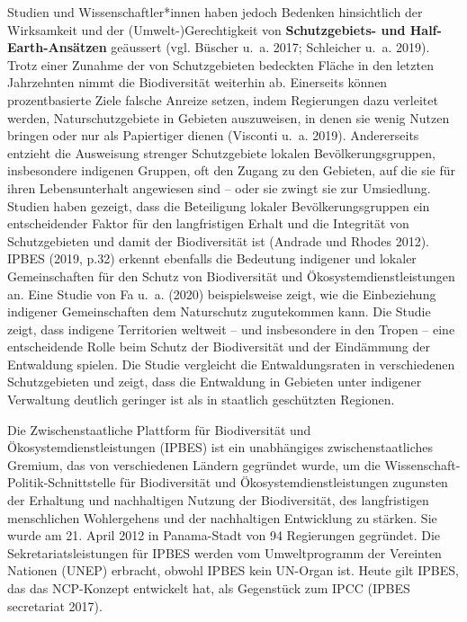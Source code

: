 \documentclass[
  nswissgerman,
  a4paper,
  openany]{book}
\begin{document}
Studien und Wissenschaftler*innen haben jedoch Bedenken hinsichtlich der
Wirksamkeit und der (Umwelt-)Gerechtigkeit von \textbf{Schutzgebiets-
und Half-Earth-Ansätzen} geäussert (vgl. Büscher u.~a. 2017; Schleicher
u.~a. 2019). Trotz einer Zunahme der von Schutzgebieten bedeckten Fläche
in den letzten Jahrzehnten nimmt die Biodiversität weiterhin ab.
Einerseits können prozentbasierte Ziele falsche Anreize setzen, indem
Regierungen dazu verleitet werden, Naturschutzgebiete in Gebieten
auszuweisen, in denen sie wenig Nutzen bringen oder nur als Papiertiger
dienen (Visconti u.~a. 2019). Andererseits entzieht die Ausweisung
strenger Schutzgebiete lokalen Bevölkerungsgruppen, insbesondere
indigenen Gruppen, oft den Zugang zu den Gebieten, auf die sie für ihren
Lebensunterhalt angewiesen sind -- oder sie zwingt sie zur Umsiedlung.
Studien haben gezeigt, dass die Beteiligung lokaler Bevölkerungsgruppen
ein entscheidender Faktor für den langfristigen Erhalt und die
Integrität von Schutzgebieten und damit der Biodiversität ist (Andrade
und Rhodes 2012). IPBES (2019, p.32) erkennt ebenfalls die Bedeutung
indigener und lokaler Gemeinschaften für den Schutz von Biodiversität
und Ökosystemdienstleistungen an. Eine Studie von Fa u.~a. (2020)
beispielsweise zeigt, wie die Einbeziehung indigener Gemeinschaften dem
Naturschutz zugutekommen kann. Die Studie zeigt, dass indigene
Territorien weltweit -- und insbesondere in den Tropen -- eine
entscheidende Rolle beim Schutz der Biodiversität und der Eindämmung der
Entwaldung spielen. Die Studie vergleicht die Entwaldungsraten in
verschiedenen Schutzgebieten und zeigt, dass die Entwaldung in Gebieten
unter indigener Verwaltung deutlich geringer ist als in staatlich
geschützten Regionen.

\begin{tcolorbox}[enhanced jigsaw, arc=.35mm, bottomrule=.15mm, bottomtitle=1mm, breakable, colback=white, colbacktitle=quarto-callout-note-color!10!white, colframe=quarto-callout-note-color-frame, coltitle=black, left=2mm, leftrule=.75mm, opacityback=0, opacitybacktitle=0.6, rightrule=.15mm, title={Was ist IPBES?}, titlerule=0mm, toprule=.15mm, toptitle=1mm]

Die Zwischenstaatliche Plattform für Biodiversität und
Ökosystemdienstleistungen (IPBES) ist ein unabhängiges
zwischenstaatliches Gremium, das von verschiedenen Ländern gegründet
wurde, um die Wissenschaft-Politik-Schnittstelle für Biodiversität und
Ökosystemdienstleistungen zugunsten der Erhaltung und nachhaltigen
Nutzung der Biodiversität, des langfristigen menschlichen Wohlergehens
und der nachhaltigen Entwicklung zu stärken. Sie wurde am 21. April 2012
in Panama-Stadt von 94 Regierungen gegründet. Die Sekretariatsleistungen
für IPBES werden vom Umweltprogramm der Vereinten Nationen (UNEP)
erbracht, obwohl IPBES kein UN-Organ ist. Heute gilt IPBES, das das
NCP-Konzept entwickelt hat, als Gegenstück zum IPCC (IPBES secretariat
2017).

\end{tcolorbox}
\end{document}
